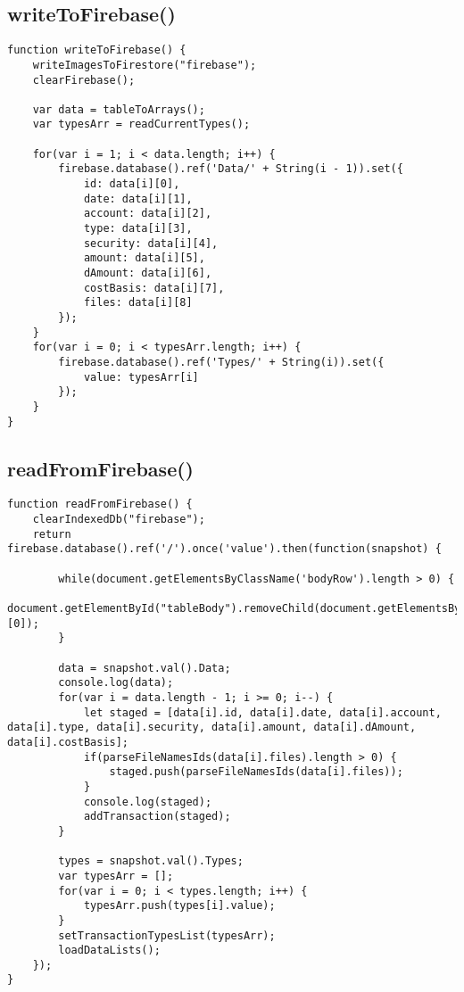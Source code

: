 \documentclass[letterpaper]{article}
\begin{document}
\subsection{writeToFirebase()}

\begin{lstlisting}[firstnumber=5]
function writeToFirebase() {
    writeImagesToFirestore("firebase");
    clearFirebase();

    var data = tableToArrays();
    var typesArr = readCurrentTypes();

    for(var i = 1; i < data.length; i++) {
        firebase.database().ref('Data/' + String(i - 1)).set({
            id: data[i][0],
            date: data[i][1],
            account: data[i][2],
            type: data[i][3],
            security: data[i][4],
            amount: data[i][5],
            dAmount: data[i][6],
            costBasis: data[i][7],
            files: data[i][8]
        });
    }
    for(var i = 0; i < typesArr.length; i++) {
        firebase.database().ref('Types/' + String(i)).set({
            value: typesArr[i]
        });
    }
}
\end{lstlisting}

\subsection{readFromFirebase()}

\begin{lstlisting}[firstnumber=32]
function readFromFirebase() {
    clearIndexedDb("firebase");
    return firebase.database().ref('/').once('value').then(function(snapshot) {

        while(document.getElementsByClassName('bodyRow').length > 0) {
            document.getElementById("tableBody").removeChild(document.getElementsByClassName('bodyRow')[0]);
        }

        data = snapshot.val().Data;
        console.log(data);
        for(var i = data.length - 1; i >= 0; i--) {
            let staged = [data[i].id, data[i].date, data[i].account, data[i].type, data[i].security, data[i].amount, data[i].dAmount, data[i].costBasis];
            if(parseFileNamesIds(data[i].files).length > 0) {
                staged.push(parseFileNamesIds(data[i].files));
            }
            console.log(staged);
            addTransaction(staged);
        }

        types = snapshot.val().Types;
        var typesArr = [];
        for(var i = 0; i < types.length; i++) {
            typesArr.push(types[i].value);
        }
        setTransactionTypesList(typesArr);
        loadDataLists();
    });
}
\end{lstlisting}
\end{document}
